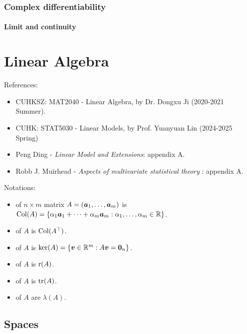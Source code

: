 \documentclass[10pt,a4paper]{book}
\begin{document}
\subsection{Complex differentiability}\label{sec:complex-diff}
\subsubsection{Limit and continuity}

\chapter{Linear Algebra}\label{chap:linear_algebra}
References: 
\begin{itemize}
	\item CUHKSZ: MAT2040 - Linear Algebra, by Dr. Dongxu Ji (2020-2021 Summer).
	\item CUHK: STAT5030 - Linear Models, by Prof. Yuanyuan Lin (2024-2025 Spring)
	\item Peng Ding - \textit{Linear Model and Extensions}: appendix A.
	\item Robb J. Muirhead - \textit{Aspects of multivariate statistical theory} \cite{muirhead1982aspects}: appendix A.
\end{itemize}

\noindent Notations:  
\begin{itemize}
	\item {} of $n\times m$ matrix $A=({\boldsymbol a}_1,\ldots,{\boldsymbol a}_m)$ is $\mathrm{Col}(A)=\{\alpha_{1}{\boldsymbol a}_{1}+\cdots+\alpha_{m}{\boldsymbol a}_{m}:\alpha_{1},\ldots,\alpha_{m}\in\mathbb R\}$.
	\item {} of $A$ is $\mathrm{Col}(A^\top)$.
	\item {} of $A$ is $\ker(A)=\{{\boldsymbol v}\in\mathbb R^{m}:A{\boldsymbol v}={\boldsymbol 0}_n\}$.  
	\item {} of $A$ is $\mathrm{r}(A)$.  
	\item {} of $A$ is $\mathrm{tr}(A)$.  
	\item {} of $A$ are $\lambda(A)$.  
\end{itemize}

\section{Spaces}\label{sec:mat_space}
\end{document}
